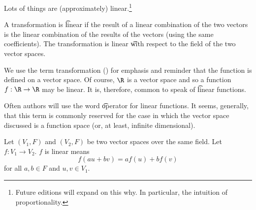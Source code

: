 

Lots of things are (approximately) linear.\footnote{Future editions will expand on this why. In particular, the intuition of proportionality.}


A transformation is \t{linear} if the result of a linear combination of the two vectors is the linear combination of the results of the vectors (using the same coefficients).
The transformation is linear \t{with respect to} the field of the two vector spaces.

We use the term transformation () for emphasis and reminder that the function is defined on a vector space.
Of course, $\R$ is a vector space and so a function $f: \R \to \R$ may be linear.
It is, therefore, common to speak of \t{linear functions}.

Often authors will use the word \t{operator} for linear functions.
It seems, generally, that this term is commonly reserved for the case in which the vector space discussed is a function space (or, at least, infinite dimensional).


Let $(V_1, F)$ and $(V_2, F)$ be two vector spaces over the same field.
Let $f: V_1 \to V_2$.
$f$ is linear means
\[
  f(au + bv) = af(u) + bf(v)
\]
for all $a, b \in F$ and $u, v \in V_1$.

\blankpage
